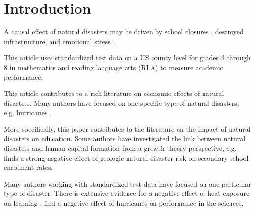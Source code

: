 
\section{Introduction}


A causal effect of natural disasters may be driven by school closures \citep{Grewening_2020}, destroyed infrastructure, and emotional stress \citep{Vogel_2016}. 

This article uses standardized test data on a US county level for grades 3 through 8 in mathematics and reading language arts (RLA) to measure academic performance. 

This article contributes to a rich literature on economic effects of natural disasters. Many authors have focused on one specific type of natural disasters, e.g. hurricanes \citep{Deryugina_2017, Deryugina_2018}. 

More specifically, this paper contributes to the literature on the impact of natural disasters on education. Some authors have investigated the link between natural disasters and human capital formation from a growth theory perspective, e.g. \cite{Cuaresma_2010} finds a strong negative effect of geologic natural disaster risk on secondary school enrolment rates. 

Many authors working with standardized test data have focused on one particular type of disaster. There is extensive evidence for a negative effect of heat exposure on learning \cite[e.g.][]{Goodman_2020, Park_2020}. \cite{Spencer_2016} find a negative effect of hurricanes on performance in the sciences.


